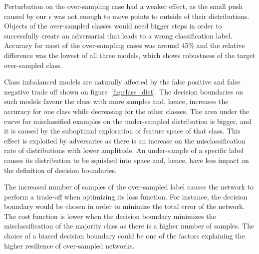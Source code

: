 \documentclass[runningheads,a4paper]{llncs}
\begin{document}
Perturbation on the over-sampling case had a weaker effect, as the small push caused by our $\epsilon$ was not enough to move points to outside of their distributions. Objects of the over-sampled classes would need bigger steps in order to successfully create an adversarial that leads to a wrong classification label. Accuracy for most of the over-sampling cases was around 45\% and the relative difference was the lowest of all three models, which shows robustness of the target over-sampled class. 

Class imbalanced models are naturally affected by the false positive and false negative trade off shown on figure~\ref{fig:class_dist}. The decision boundaries on such models favour the class with more samples and, hence, increases the accuracy for one class while decreasing for the other classes. The area under the curve for misclassified examples on the under-sampled distribution is bigger, and it is caused by the suboptimal exploration of feature space of that class. This effect is exploited by adversaries as there is an increase on the misclassification rate of distributions with lower amplitude. An under-sample of a specific label causes its distribution to be squished into space and, hence, have less impact on the definition of decision boundaries.

The increased number of samples of the over-sampled label causes the network to perform a trade-off when optimizing its loss function. For instance, the decision boundary would be chosen in order to minimize the total error of the network. The cost function is lower when the decision boundary minimizes the misclassification of the majority class as there is a higher number of samples. The choice of a biased decision boundary could be one of the factors explaining the higher resilience of over-sampled networks.
\end{document}
